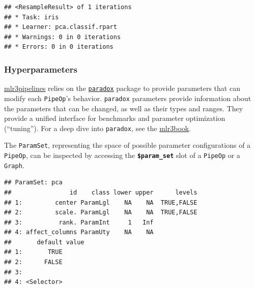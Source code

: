 \documentclass[]{article}
\newenvironment{Shaded}{\begin{snugshade}}{\end{snugshade}}
\newcommand{\KeywordTok}[1]{\textcolor[rgb]{0.13,0.29,0.53}{\textbf{#1}}}
\newcommand{\NormalTok}[1]{#1}
\newcommand{\OperatorTok}[1]{\textcolor[rgb]{0.81,0.36,0.00}{\textbf{#1}}}
\newcommand{\StringTok}[1]{\textcolor[rgb]{0.31,0.60,0.02}{#1}}
\renewenvironment{Shaded} {\begin{snugshade}\small} {\end{snugshade}}
\begin{document}
\begin{Shaded}
\end{Shaded}

\begin{verbatim}
## <ResampleResult> of 1 iterations
## * Task: iris
## * Learner: pca.classif.rpart
## * Warnings: 0 in 0 iterations
## * Errors: 0 in 0 iterations
\end{verbatim}

\hypertarget{hyperparameters}{%
\subsubsection{Hyperparameters}\label{hyperparameters}}

\href{https://cran.r-project.org/package=mlr3pipelines}{mlr3pipelines} relies on the \href{https://paradox.mlr-org.com}{\texttt{paradox}} package to provide parameters that can modify each \texttt{PipeOp}'s behavior.
\texttt{paradox} parameters provide information about the parameters that can be changed, as well as their types and ranges.
They provide a unified interface for benchmarks and parameter optimization (``tuning'').
For a deep dive into \texttt{paradox}, see the \href{https://mlr3book.mlr-org.com}{mlr3book}.

The \texttt{ParamSet}, representing the space of possible parameter configurations of a \texttt{PipeOp}, can be inspected by accessing the \textbf{\texttt{\$param\_set}} slot of a \texttt{PipeOp} or a \texttt{Graph}.

\begin{Shaded}
\end{Shaded}

\begin{verbatim}
## ParamSet: pca
##                id    class lower upper      levels
## 1:         center ParamLgl    NA    NA  TRUE,FALSE
## 2:         scale. ParamLgl    NA    NA  TRUE,FALSE
## 3:          rank. ParamInt     1   Inf            
## 4: affect_columns ParamUty    NA    NA            
##       default value
## 1:       TRUE      
## 2:      FALSE      
## 3:                 
## 4: <Selector>
\end{verbatim}
\end{document}
